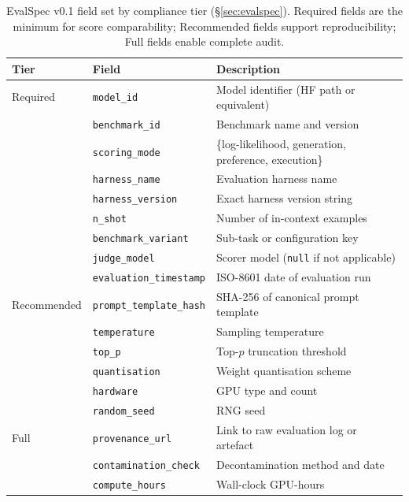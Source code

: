\documentclass[11pt]{article}
\begin{document}
\begin{table}[!htbp]
\centering
\small
\setlength{\tabcolsep}{4pt}
\begin{tabular}{lll}
\toprule
\textbf{Tier} & \textbf{Field} & \textbf{Description} \\
\midrule
Required & \texttt{model\_id}               & Model identifier (HF path or equivalent) \\
         & \texttt{benchmark\_id}           & Benchmark name and version \\
         & \texttt{scoring\_mode}           & \{log-likelihood, generation, preference, execution\} \\
         & \texttt{harness\_name}           & Evaluation harness name \\
         & \texttt{harness\_version}        & Exact harness version string \\
         & \texttt{n\_shot}                 & Number of in-context examples \\
         & \texttt{benchmark\_variant}      & Sub-task or configuration key \\
         & \texttt{judge\_model}            & Scorer model (\texttt{null} if not applicable) \\
         & \texttt{evaluation\_timestamp}   & ISO-8601 date of evaluation run \\
\midrule
Recommended & \texttt{prompt\_template\_hash} & SHA-256 of canonical prompt template \\
            & \texttt{temperature}           & Sampling temperature \\
            & \texttt{top\_p}                & Top-$p$ truncation threshold \\
            & \texttt{quantisation}          & Weight quantisation scheme \\
            & \texttt{hardware}              & GPU type and count \\
            & \texttt{random\_seed}          & RNG seed \\
\midrule
Full & \texttt{provenance\_url}             & Link to raw evaluation log or artefact \\
     & \texttt{contamination\_check}        & Decontamination method and date \\
     & \texttt{compute\_hours}              & Wall-clock GPU-hours \\
\bottomrule
\end{tabular}
\caption{EvalSpec v0.1 field set by compliance tier (\S\ref{sec:evalspec}).
Required fields are the minimum for score comparability;
Recommended fields support reproducibility;
Full fields enable complete audit.}
\label{tab:evalspec-fields-app}
\end{table}
\end{document}
